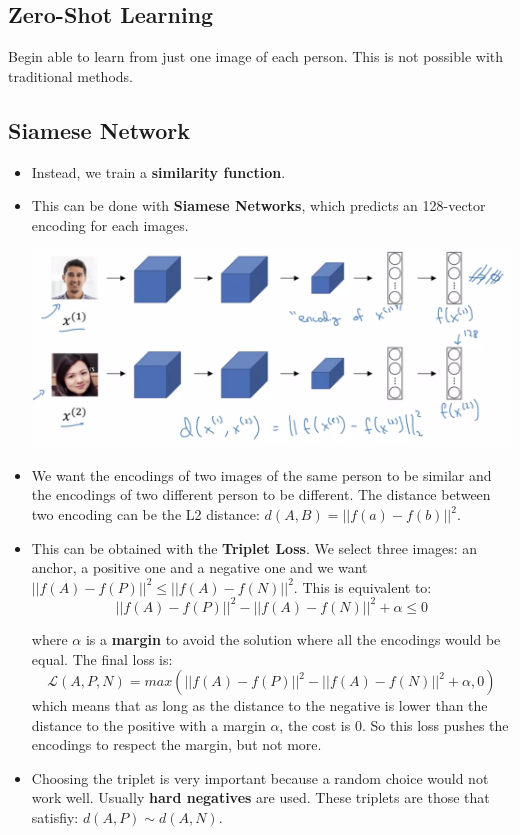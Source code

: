 \subsection{Zero-Shot Learning}
Begin able to learn from just one image of each person. This is not possible with traditional methods.


\subsection{Siamese Network}

\begin{itemize}
    \item Instead, we train a \textbf{similarity function}.
    \item This can be done with \textbf{Siamese Networks}, which predicts an 128-vector encoding for each images.
    
    
    \includegraphics[scale=0.15]{content/Siamese_Network.png}
    
    
    \item We want the encodings of two images of the same person to be similar and the encodings of two different person to be different. The distance between two encoding can be the L2 distance: $d(A, B) = ||f(a)-f(b)||^2$.
    \item This can be obtained with the \textbf{Triplet Loss}. We select three images: an anchor, a positive one and a negative one and we want $||f(A)-f(P)||^2 \leq ||f(A)-f(N)||^2$. This is equivalent to:
    \begin{equation}
        ||f(A)-f(P)||^2 - ||f(A)-f(N)||^2 + \alpha \leq 0
    \end{equation}
    
    where $\alpha$ is a \textbf{margin} to avoid the solution where all the encodings would be equal.
    The final loss is:
    \begin{equation}
        \mathcal{L}(A, P, N) = max(||f(A)-f(P)||^2 - ||f(A)-f(N)||^2 + \alpha, 0)
    \end{equation}
    which means that as long as the distance to the negative is lower than the distance to the positive with a margin $\alpha$, the cost is 0. So this loss pushes the encodings to respect the margin, but not more.
    \item Choosing the triplet is very important because a random choice would not work well. Usually \textbf{hard negatives} are used. These triplets are those that satisfiy: $d(A,P) \sim d(A,N)$.

\end{itemize}


